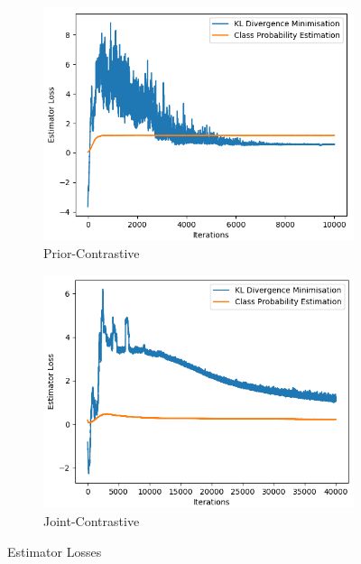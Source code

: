 \documentclass[honours,12pt]{unswthesis}
\numberwithin{equation}{section}
\theoremstyle{definition}
\begin{document}
\begin{figure}[h!]
\begin{subfigure}{0.49\textwidth}
\includegraphics[width=\linewidth]{estimator_losses/PCKLvsPCADV.png}
\caption{Prior-Contrastive}
\end{subfigure}
\begin{subfigure}{0.49\textwidth}
\includegraphics[width=\linewidth]{estimator_losses/JCKLvsJCADV.png}
\caption{Joint-Contrastive}
\end{subfigure}
\caption{Estimator Losses}
\end{figure}
\end{document}
